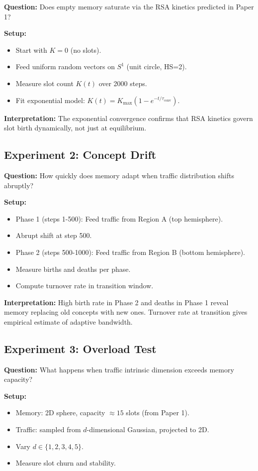 \documentclass[11pt]{article}
\begin{document}
\textbf{Question:} Does empty memory saturate via the RSA kinetics predicted in Paper 1?

\textbf{Setup:}
\begin{itemize}
  \item Start with $K = 0$ (no slots).
  \item Feed uniform random vectors on $S^1$ (unit circle, HS=2).
  \item Measure slot count $K(t)$ over 2000 steps.
  \item Fit exponential model: $K(t) = K_{\max}(1 - e^{-t/\tau_{\text{conv}}})$.
\end{itemize}

\textbf{Interpretation:}
The exponential convergence confirms that RSA kinetics govern slot birth dynamically, not just at equilibrium.

\subsection{Experiment 2: Concept Drift}

\textbf{Question:} How quickly does memory adapt when traffic distribution shifts abruptly?

\textbf{Setup:}
\begin{itemize}
  \item Phase 1 (steps 1-500): Feed traffic from Region A (top hemisphere).
  \item Abrupt shift at step 500.
  \item Phase 2 (steps 500-1000): Feed traffic from Region B (bottom hemisphere).
  \item Measure births and deaths per phase.
  \item Compute turnover rate in transition window.
\end{itemize}

\textbf{Interpretation:}
High birth rate in Phase 2 and deaths in Phase 1 reveal memory replacing old concepts with new ones.
Turnover rate at transition gives empirical estimate of adaptive bandwidth.

\subsection{Experiment 3: Overload Test}

\textbf{Question:} What happens when traffic intrinsic dimension exceeds memory capacity?

\textbf{Setup:}
\begin{itemize}
  \item Memory: 2D sphere, capacity $\approx 15$ slots (from Paper 1).
  \item Traffic: sampled from $d$-dimensional Gaussian, projected to 2D.
  \item Vary $d \in \{1, 2, 3, 4, 5\}$.
  \item Measure slot churn and stability.
\end{itemize}
\end{document}
